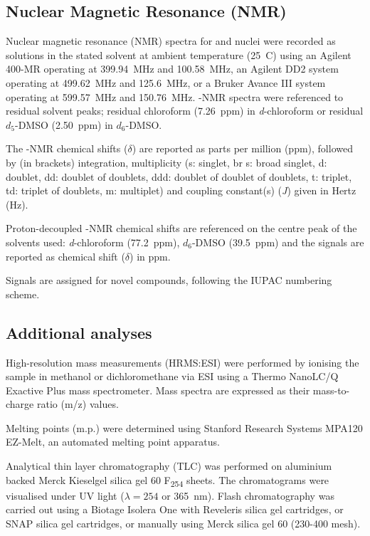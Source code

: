 \begin{refsection}
\subsection{Nuclear Magnetic Resonance (NMR)}
Nuclear magnetic resonance (NMR) spectra for  and  nuclei were recorded as solutions in the stated solvent at ambient temperature (25~\degree{}C) using an Agilent 400-MR operating at 399.94~MHz and 100.58~MHz, an Agilent DD2 system operating at 499.62~MHz and 125.6~MHz, or a Bruker Avance III system operating at 599.57~MHz and 150.76~MHz. 
-NMR spectra were referenced to residual solvent peaks; residual chloroform (7.26~ppm) in \textit{d}-chloroform or residual $d_5$-DMSO (2.50~ppm) in $d_6$-DMSO.\@

The -NMR chemical shifts ($\delta$) are reported as parts per million (ppm), followed
by (in brackets) integration, multiplicity (s: singlet, br s: broad singlet, d: doublet, dd: doublet of doublets, ddd: doublet of doublet of doublets, t: triplet, td: triplet of doublets, m: multiplet) and coupling constant(s) (\textit{J}) given in Hertz (Hz).

Proton-decoupled -NMR chemical shifts are referenced on the centre peak of the
solvents used: \textit{d}-chloroform (77.2~ppm), $d_6$-DMSO (39.5~ppm) and the signals are reported as chemical shift ($\delta$) in ppm.

Signals are assigned for novel compounds, following the IUPAC numbering scheme.

\subsection{Additional analyses}
High-resolution mass measurements (HRMS:ESI) were performed by ionising the sample in methanol or dichloromethane via ESI using a Thermo NanoLC/Q Exactive Plus mass spectrometer.
Mass spectra are expressed as their mass-to-charge ratio (m/z) values.

Melting points (m.p.) were determined using Stanford Research Systems MPA120 EZ-Melt, an automated melting point apparatus.

Analytical thin layer chromatography (TLC) was performed on aluminium backed Merck Kieselgel silica gel 60 F\textsubscript{254} sheets. 
The chromatograms were visualised under UV light ($\lambda = 254$ or 365~nm). 
Flash chromatography was carried out using a Biotage Isolera One with Reveleris silica gel cartridges, or SNAP silica gel cartridges, or manually using Merck silica gel 60 (230-400 mesh).


\end{refsection}
